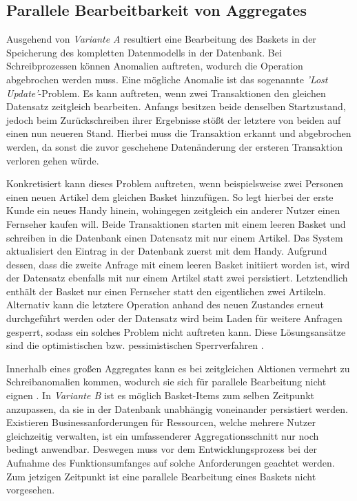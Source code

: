 \subsection{Parallele Bearbeitbarkeit von Aggregates}

Ausgehend von \emph{Variante A} resultiert eine Bearbeitung des Baskets in der Speicherung des kompletten Datenmodells in der Datenbank. Bei Schreibprozessen können Anomalien auftreten, wodurch die Operation abgebrochen werden muss. Eine mögliche Anomalie ist das sogenannte \emph{'\Gls{Lost Update}'}-Problem. Es kann auftreten, wenn zwei Transaktionen den gleichen Datensatz zeitgleich bearbeiten. Anfangs besitzen beide denselben Startzustand, jedoch beim Zurückschreiben ihrer Ergebnisse stößt der letztere von beiden auf einen nun neueren Stand. Hierbei muss die Transaktion erkannt und abgebrochen werden, da sonst die zuvor geschehene Datenänderung der ersteren Transaktion verloren gehen würde.

Konkretisiert kann dieses Problem auftreten, wenn beispielsweise zwei Personen einen neuen Artikel dem gleichen Basket hinzufügen. So legt hierbei der erste Kunde ein neues Handy hinein, wohingegen zeitgleich ein anderer Nutzer einen Fernseher kaufen will. Beide Transaktionen starten mit einem leeren Basket und schreiben in die Datenbank einen Datensatz mit nur einem Artikel. Das System aktualisiert den Eintrag in der Datenbank zuerst mit dem Handy. Aufgrund dessen, dass die zweite Anfrage mit einem leeren Basket initiiert worden ist, wird der Datensatz ebenfalls mit nur einem Artikel statt zwei persistiert. Letztendlich enthält der Basket nur einen Fernseher statt den eigentlichen zwei Artikeln. Alternativ kann die letztere Operation anhand des neuen Zustandes erneut durchgeführt werden oder der Datensatz wird beim Laden für weitere Anfragen gesperrt, sodass ein solches Problem nicht auftreten kann. Diese Lösungsansätze sind die optimistischen bzw. pessimistischen Sperrverfahren \cite[S. 385f.]{Vernon.2015}.

Innerhalb eines großen Aggregates kann es bei zeitgleichen Aktionen vermehrt zu Schreibanomalien kommen, wodurch sie sich für parallele Bearbeitung nicht eignen \cite[S. 2]{Vernon.2011}. In \emph{Variante B} ist es möglich Basket-Items zum selben Zeitpunkt anzupassen, da sie in der Datenbank unabhängig voneinander persistiert werden. Existieren Businessanforderungen für Ressourcen, welche mehrere Nutzer gleichzeitig verwalten, ist ein umfassenderer Aggregationsschnitt nur noch bedingt anwendbar. Deswegen muss vor dem Entwicklungsprozess bei der Aufnahme des Funktionsumfanges auf solche Anforderungen geachtet werden. Zum jetzigen Zeitpunkt ist eine parallele Bearbeitung eines Baskets nicht vorgesehen.


